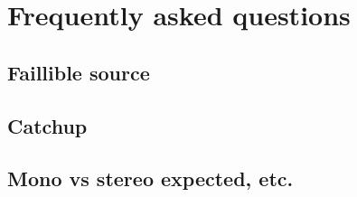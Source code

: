 \chapter{Frequently asked questions}
\section{Faillible source}

\section{Catchup}

\section{Mono vs stereo expected, etc.}